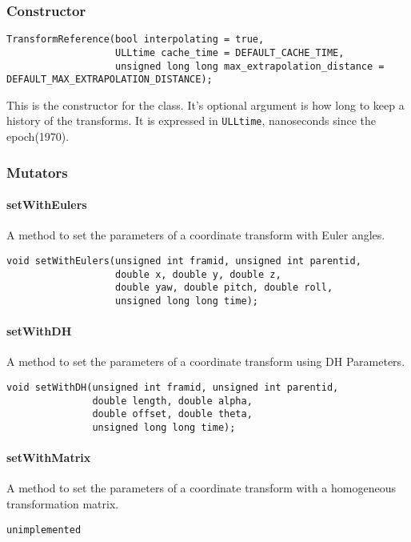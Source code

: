 \documentclass[12pt]{article}
\begin{document}
\subsubsection{Constructor}
\begin{verbatim}
TransformReference(bool interpolating = true, 
                   ULLtime cache_time = DEFAULT_CACHE_TIME,
                   unsigned long long max_extrapolation_distance = DEFAULT_MAX_EXTRAPOLATION_DISTANCE);

\end{verbatim}
This is the constructor for the class.  It's optional argument is 
how long to keep a history of the transforms.  It is expressed in 
\texttt{ULLtime}, nanoseconds since the epoch(1970).  

\subsubsection{Mutators}

\paragraph{setWithEulers}
A method to set the parameters of a coordinate transform with Euler angles. 
\begin{verbatim}
void setWithEulers(unsigned int framid, unsigned int parentid, 
                   double x, double y, double z, 
                   double yaw, double pitch, double roll, 
                   unsigned long long time);
\end{verbatim}

\paragraph{setWithDH}
A method to set the parameters of a coordinate transform using DH Parameters. 
\begin{verbatim} 
void setWithDH(unsigned int framid, unsigned int parentid, 
               double length, double alpha, 
               double offset, double theta, 
               unsigned long long time);
\end{verbatim}



\paragraph{setWithMatrix}
A method to set the parameters of a coordinate transform with a homogeneous transformation matrix. 
\begin{verbatim}
unimplemented
\end{verbatim}
\end{document}
